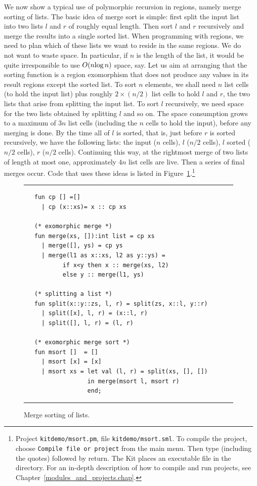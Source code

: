 \documentclass[12pt]{book}
\begin{document}
We now show a typical use of polymorphic recursion in regions, namely
merge sorting of lists. The basic idea of merge sort is simple: first
split the input list into two lists $l$ and $r$ of roughly equal
length.  Then sort $l$ and $r$ recursively and merge the results into
a single sorted list.  When programming with regions, we need to plan
which of these lists we want to reside in the same regions. We do not
want to waste space. In particular, if $n$ is the length of the list,
it would be quite irresponsible to use $O(n\hbox{log}\,n)$ space, say.
Let us aim at arranging that the sorting function is a region
exomorphism that does not produce any values in its result regions
except the sorted list. To sort $n$ elements, we shall need $n$ list
cells (to hold the input list) plus roughly $2\times(n/2)$ list cells
to hold $l$ and $r$, the two lists that arise from splitting the input
list. To sort $l$ recursively, we need space for the two lists
obtained by splitting $l$ and so on. The space consumption grows to a
maximum of $3n$ list cells (including the $n$ cells to hold the
input), before any merging is done.  By the time all of $l$ is sorted,
that is, just before $r$ is sorted recursively, we have the following
lists: the input ($n$ cells), $l$ ($n/2$ cells), $l$ sorted ($n/2$
cells), $r$ ($n/2$ cells). Continuing this way, at the rightmost merge
of two lists of length at most one, approximately $4n$ list cells are
live.  Then a series of final merges occur.  Code that uses these
ideas is listed in 
%
%
%
%
%
Figure~\ref{msort.fig}.\footnote{Project
  {\tt kitdemo/msort.pm}, file {\tt kitdemo/msort.sml}. To compile the
  project, choose {\tt Compile file or project} from the main menu.
  Then type  (including the quotes) followed by
  return. The Kit
  places an executable file  in the 
  directory. For an in-depth description of how to compile and run
  projects, see Chapter~\ref{modules_and_projects.chap}.}
\begin{figure}[hbt]
\hrule
\medskip
\begin{verbatim}
   fun cp [] =[]
     | cp (x::xs)= x :: cp xs

   (* exomorphic merge *)
   fun merge(xs, []):int list = cp xs
     | merge([], ys) = cp ys
     | merge(l1 as x::xs, l2 as y::ys) = 
           if x<y then x :: merge(xs, l2) 
           else y :: merge(l1, ys)

   (* splitting a list *)
   fun split(x::y::zs, l, r) = split(zs, x::l, y::r)
     | split([x], l, r) = (x::l, r)
     | split([], l, r) = (l, r)

   (* exomorphic merge sort *)
   fun msort []  = []
     | msort [x] = [x]
     | msort xs = let val (l, r) = split(xs, [], [])
                  in merge(msort l, msort r)
                  end;
\end{verbatim}
\caption{Merge sorting of lists.}
\label{msort.fig}
\medskip\hrule
\end{figure}
\end{document}
